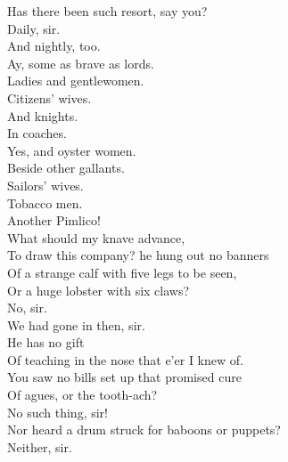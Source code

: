 \documentclass[a4paper,oneside]{memoir}
\begin{document}
\begin{drama*}
\scene

\lovewitspeaks Has there been such resort, say you?\\
\neighonespeaks {} Daily, sir.\\
\neightwospeaks And nightly, too.\\
\neighthreespeaks {} Ay, some as brave as lords.\\
\neighfourspeaks Ladies and gentlewomen.\\
\neighfivespeaks {} Citizens' wives.\\
\neighonespeaks And knights.\\
\neighsixspeaks {} In coaches.\\
\neightwospeaks {} Yes, and oyster women.\\
\neighonespeaks Beside other gallants.\\
\neighthreespeaks {} Sailors' wives.\\
\neighfourspeaks {} Tobacco men.\\
\neighfivespeaks Another Pimlico!\\
\lovewitspeaks {} What should my knave advance,\\
To draw this company? he hung out no banners\\
Of a strange calf with five legs to be seen,\\
Or a huge lobster with six claws?\\
\neighsixspeaks {} No, sir.\\
\neighthreespeaks We had gone in then, sir.\\
\lovewitspeaks {} He has no gift\\
Of teaching in the nose that e'er I knew of.\\
You saw no bills set up that promised cure\\
Of agues, or the tooth-ach?\\
\neightwospeaks {} No such thing, sir!\\
\lovewitspeaks Nor heard a drum struck for baboons or puppets?\\
\neighfivespeaks Neither, sir.\\

\end{drama*}
\end{document}
